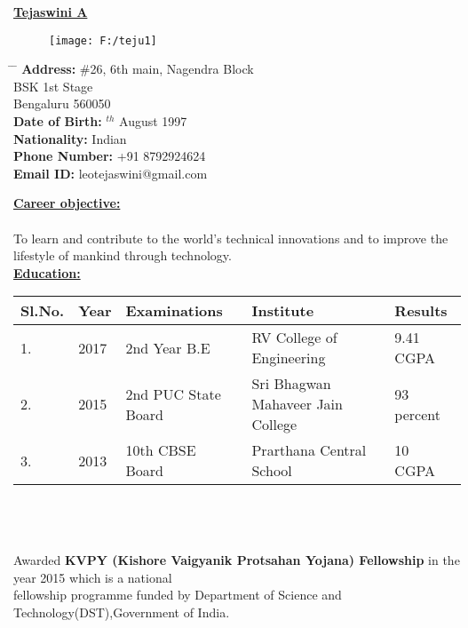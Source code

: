 \documentclass[10pt]{article}
\begin{document}
\hspace{4cm}
\underline{\textbf{\huge{Tejaswini A}}}

\begin{figure}[h]
	\hspace{5cm}
	\texttt{[image: F:/teju1]}
\end{figure}

\parbox{1.5\textwidth}{
	\begin{tabbing} 
		\hspace{3cm} \= \hspace{10cm} \= \kill
		{\bf Address:} \> \#26, 6th main, Nagendra Block\\ 
		\> BSK 1st Stage\\ 
		\> Bengaluru 560050\\
		{\bf Date of Birth:} $^{th}$ August 1997  \\ 
		{\bf Nationality:} \> Indian\\
		{\bf Phone Number:} \> +91 8792924624\\
		{\bf Email ID:} \>leotejaswini@gmail.com\\
\end{tabbing}}
\hfill

\underline{\textbf{\Large{Career objective:}}}\\\\To learn and contribute to the world's technical innovations and to improve the lifestyle of mankind through technology.
\hfill\\
	
\underline{\textbf{\Large{Education:}}}
\vspace{0.5cm}


\begin{tabular}{|p{1.5cm}|p{1.5cm}|p{5cm}|p{4.5cm}|p{2.5cm}|}
	\hline
	\textbf{Sl.No.} & \textbf{Year} & \textbf{Examinations} & \textbf{Institute} & \textbf{Results}\\ [0.5ex] 
	\hline
	1. & 2017 &2nd Year B.E &RV College of Engineering& 9.41 CGPA \\ 
	\hline
	2. & 2015 &2nd PUC State Board & Sri Bhagwan Mahaveer Jain College& 93 percent \\
	\hline
	3. & 2013 & 10th CBSE Board & Prarthana Central School &10 CGPA \\
	\hline
	
\end{tabular}
\\\\\\
Awarded \textbf{KVPY (Kishore Vaigyanik Protsahan Yojana) Fellowship} in the year 2015 which is a national\\ fellowship  programme funded by Department of Science and Technology(DST),Government of India.
\hfill 
\end{document}
